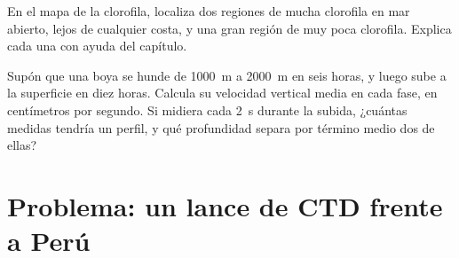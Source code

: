 \begin{exercise}[$\star\star\star$]\label{exo:g10:layered-ocean:14}
En el mapa de la clorofila, localiza dos regiones de mucha clorofila en mar
abierto, lejos de cualquier costa, y una gran región de muy poca clorofila.
Explica cada una con ayuda del capítulo.
\end{exercise}

\begin{exercise}[$\star\star\star$]\label{exo:g10:layered-ocean:15}
Supón que una boya se hunde de \qty{1000}{m} a \qty{2000}{m} en seis horas, y
luego sube a la superficie en diez horas. Calcula su velocidad vertical media
en cada fase, en centímetros por segundo. Si midiera cada \qty{2}{s} durante
la subida, ¿cuántas medidas tendría un perfil, y qué profundidad separa por
término medio dos de ellas?
\end{exercise}

\section{Problema: un lance de CTD frente a Perú}

